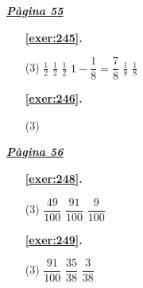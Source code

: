 \hyperlink{page.55}{\textbf{\em Pàgina 55}}
\begin{enumerate}



 \item[\fontfamily{phv}\selectfont\color{blue}\textbf{\ref{exer:245}. }] \label{ans:245}
 \begin{tasks}[column-sep=1em, item-indent=1.3333em](3)
	 \task $\frac {1}{2}$
	 \task $\frac {1}{2}$
	 \task $\frac {1}{2}$
	 \task* $1-\dfrac {1}{8}=\dfrac {7}{8}$
	 \task $\frac {1}{8}$
	 \task $\frac {1}{8}$
\end{tasks}
 \end{enumerate}
\begin{enumerate}



 \item[\fontfamily{phv}\selectfont\color{blue}\textbf{\ref{exer:246}. }] \label{ans:246}
 \begin{tasks}[column-sep=1em, item-indent=1.3333em](3)
\end{tasks}
 \end{enumerate}
\vspace{0.3cm}


\hyperlink{page.56}{\textbf{\em Pàgina 56}}
\begin{enumerate}



 \item[\fontfamily{phv}\selectfont\color{blue}\textbf{\ref{exer:248}. }] \label{ans:248}
 \begin{tasks}[column-sep=1em, item-indent=1.3333em](3)
	 \task $\dfrac {49}{100}$
	 \task $\dfrac {91}{100}$
	 \task $\dfrac {9}{100}$
\end{tasks}
 \end{enumerate}
\begin{enumerate}



 \item[\fontfamily{phv}\selectfont\color{blue}\textbf{\ref{exer:249}. }] \label{ans:249}
 \begin{tasks}[column-sep=1em, item-indent=1.3333em](3)
	 \task $\dfrac {91}{100}$
	 \task $\dfrac {35}{38}$
	 \task $\dfrac {3}{38}$
\end{tasks}
 \end{enumerate}
\vspace{0.3cm}

